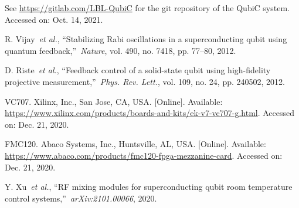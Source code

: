 \documentclass{ieeetran}
\begin{document}
\begin{thebibliography}{00}
 See \ul{https://gitlab.com/LBL-QubiC} for the git repository of the QubiC system. Accessed on: Oct. 14, 2021.

 R. Vijay~\emph{et al.}, ``Stabilizing Rabi oscillations in a superconducting qubit using quantum feedback,''~\emph{Nature}, vol. 490, no. 7418, pp. 77--80, 2012.

 D. Riste~\emph{et al.}, ``Feedback control of a solid-state qubit using high-fidelity projective measurement,''~\emph{Phys. Rev. Lett.}, vol. 109, no. 24, pp. 240502, 2012.







 VC707. Xilinx, Inc., San Jose, CA, USA. [Online]. Available: 
\ul{https://www.xilinx.com/products/boards-and-kits/ek-v7-vc707-g.html}. Accessed on: Dec. 21, 2020.

 FMC120. Abaco Systems, Inc., Huntsville, AL, USA. [Online]. Available: 
\ul{https://www.abaco.com/products/fmc120-fpga-mezzanine-card}. Accessed on: Dec. 21, 2020.

 Y. Xu~\emph{et al.}, ``RF mixing modules for superconducting qubit room temperature control systems,''~\emph{arXiv:2101.00066}, 2020.


\end{thebibliography}
\end{document}
